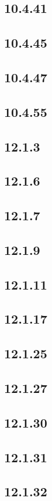 \documentclass[12pt]{article}
\begin{document}
\subsection*{10.4.41}
\subsection*{10.4.45}
\subsection*{10.4.47}
\subsection*{10.4.55}

\subsection*{12.1.3}
\subsection*{12.1.6}
\subsection*{12.1.7}
\subsection*{12.1.9}
\subsection*{12.1.11}
\subsection*{12.1.17}
\subsection*{12.1.25}
\subsection*{12.1.27}
\subsection*{12.1.30}
\subsection*{12.1.31}
\subsection*{12.1.32}
\end{document}
